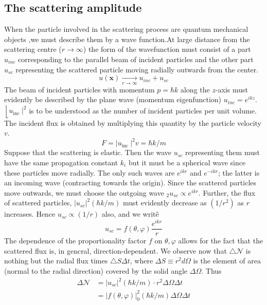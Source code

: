 \subsection{The scattering amplitude}
When the particle involved in the scattering process are quantum mechanical objects ,we must describe them by a wave function.At large distance from the scattering centre ($r\rightarrow \infty$) the form of the wavefunction must consist of a part $u_{inc}$ corresponding to the parallel beam of incident particles and the other part $u_{sc}$ representing the scattered particle moving radially outwards from the center.\\
$$u(\mathbf{x}) \underset{r \rightarrow \infty}{\longrightarrow} u_{i n c}+u_{s c}$$
The beam of incident particles with momentum $p=\hbar k$ along the $z$-axis must evidently be described by the plane wave (momentum eigenfunction) $u_{i n c}=e^{i k z}$.\\
 $\left\lfloor\left. u_{\text {inc }}\right|^{2}\right.$ is to be understood as the number of incident particles per unit volume. The incident flux is obtained by multiplying this quantity by the particle velocity $v$.
$$
F=\left|u_{\text {inc }}\right|^{2} v=\hbar k / m
$$ 
Suppose that the scattering is elastic. Then the wave $u_{s c}$ representing them must have the same propagation constant $k_{i}$ but it must be a spherical wave since these particles move radially. The only such waves are $e^{i k r}$ and $e^{-i k r}$; the latter is an incoming wave (contracting towards the origin). Since the scattercd particles move outwards, we must choose the outgoing wave $_{2} u_{s c} \propto e^{i k r}$. Further, the flux of scattered particles, $\left|u_{s c}\right|^{2}(\hbar k / m)$ must evidently decrease as $\left(1 / r^{2}\right)$ as $r$ increases. Hence $u_{s c} \propto(1 / r)$ also, and we writê
$$
u_{s c}=f(\theta, \varphi) \frac{e^{i k r}}{r}
$$
The dependence of the proportionality factor $f$ on $\theta, \varphi$ allows for the fact that the scattered flux is, in gencral, direction-dependent. We observe now that $\triangle \mathcal{N}$ is nothing but the radial flux times $\triangle S \Delta t$, where $\Delta S \equiv r^{2} d \Omega$ is the element of area (normal to the radial direction) covered by the solid angle $\Delta \Omega$. Thus
$$
\begin{aligned}
\Delta \mathcal{N} &=\left|u_{s c}\right|^{2}(\hbar k / m) \cdot r^{2} \Delta \Omega \Delta t \\
&=|f(\theta, \varphi)|_{0}^{2}(\hbar k / m) \Delta \Omega \Delta t
\end{aligned}
$$

